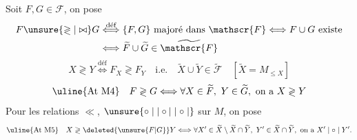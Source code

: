 Soit $F,G\in\mathscr{F}$, on pose
\[
\begin{aligned}
F\unsure{\gtrless|\bowtie}G&\overset{\text{déf}}{\Longleftrightarrow}\{F,G\}\text{ majoré dans }\mathscr{F}\Longleftrightarrow F\cup G\text{ existe}\\
&\Longleftrightarrow\widetilde{F}\cup\widetilde{G}\in\widetilde{\mathscr{F}}
\end{aligned}
\]
\[
X\gtrless Y\overset{\text{déf}}{\Longleftrightarrow}F_X\gtrless F_Y\quad\text{i.e.}\quad\widetilde{X}\cup\widetilde{Y}\in\widetilde{\mathscr{F}}\quad[\widetilde{X}=M_{\leq X}]
\]
\[
\text{\uline{At M4}}\quad F\gtrless G\Longleftrightarrow\forall X\in\widetilde{F},\ Y\in\widetilde{G},\text{ on a }X\gtrless Y
\]
 Pour les relations  $\ll$, $\unsure{\circ\mid|\circ|\mid\circ\mid}$ sur $M$, on pose
\[
\text{\uline{At M5}}\quad X\gtrless\deleted{\unsure{F|G}}Y\Longleftrightarrow\forall X'\in\widetilde{X}\setminus\widetilde{X}\cap\widetilde{Y},\ Y'\in\widetilde{X}\cap\widetilde{Y},\text{ on a }X'\mid\circ\mid Y'.
\]
